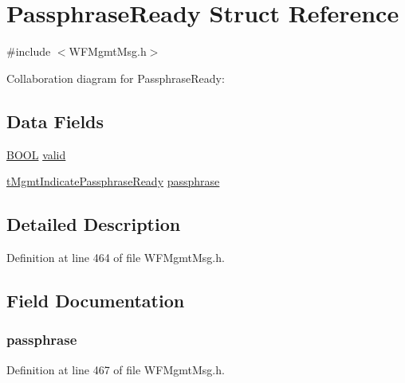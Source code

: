 \hypertarget{struct_passphrase_ready}{}\section{Passphrase\+Ready Struct Reference}
\label{struct_passphrase_ready}


{\ttfamily \#include $<$W\+F\+Mgmt\+Msg.\+h$>$}



Collaboration diagram for Passphrase\+Ready\+:
\subsection*{Data Fields}
\begin{DoxyCompactItemize}
\item 
\hyperlink{_generic_type_defs_8h_a54d65c7fa62e62c9754371e42f5111b9}{B\+O\+O\+L} \hyperlink{struct_passphrase_ready_a90686a66acdb55c0b14babfa9c621541}{valid}
\item 
\hyperlink{_w_f_mgmt_msg_8h_a0224c75a1fd852c80b9b741d1bb57807}{t\+Mgmt\+Indicate\+Passphrase\+Ready} \hyperlink{struct_passphrase_ready_aa0698551fade9e008795666067db1cac}{passphrase}
\end{DoxyCompactItemize}


\subsection{Detailed Description}


Definition at line 464 of file W\+F\+Mgmt\+Msg.\+h.



\subsection{Field Documentation}
\hypertarget{struct_passphrase_ready_aa0698551fade9e008795666067db1cac}{}
\subsubsection[{passphrase}]{ passphrase}\label{struct_passphrase_ready_aa0698551fade9e008795666067db1cac}


Definition at line 467 of file W\+F\+Mgmt\+Msg.\+h.

